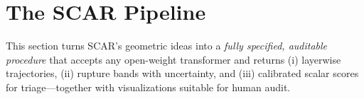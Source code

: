 \documentclass[11pt]{article}
\begin{document}










































\vspace{1em}
\section{The SCAR Pipeline}
\label{sec:scar-pipeline}

\noindent
This section turns SCAR’s geometric ideas into a \emph{fully specified, auditable procedure} that accepts any open-weight transformer and returns (i) layerwise trajectories, (ii) rupture bands with uncertainty, and (iii) calibrated scalar scores for triage—together with visualizations suitable for human audit.
\end{document}
